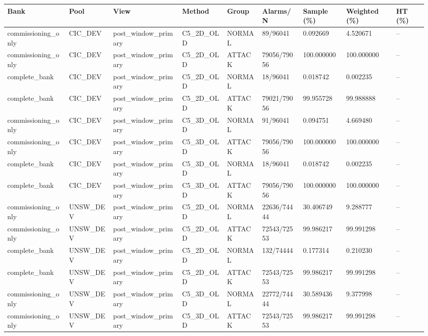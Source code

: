 \begin{tabular}{lllllllll}
\hline
Bank & Pool & View & Method & Group & Alarms/N & Sample (\%) & Weighted (\%) & HT (\%) \\
\hline
commissioning\_only & CIC\_DEV & post\_window\_primary & C5\_2D\_OLD & NORMAL & 89/96041 & 0.092669 & 4.520671 & -- \\
commissioning\_only & CIC\_DEV & post\_window\_primary & C5\_2D\_OLD & ATTACK & 79056/79056 & 100.000000 & 100.000000 & -- \\
complete\_bank & CIC\_DEV & post\_window\_primary & C5\_2D\_OLD & NORMAL & 18/96041 & 0.018742 & 0.002235 & -- \\
complete\_bank & CIC\_DEV & post\_window\_primary & C5\_2D\_OLD & ATTACK & 79021/79056 & 99.955728 & 99.988888 & -- \\
commissioning\_only & CIC\_DEV & post\_window\_primary & C5\_3D\_OLD & NORMAL & 91/96041 & 0.094751 & 4.669480 & -- \\
commissioning\_only & CIC\_DEV & post\_window\_primary & C5\_3D\_OLD & ATTACK & 79056/79056 & 100.000000 & 100.000000 & -- \\
complete\_bank & CIC\_DEV & post\_window\_primary & C5\_3D\_OLD & NORMAL & 18/96041 & 0.018742 & 0.002235 & -- \\
complete\_bank & CIC\_DEV & post\_window\_primary & C5\_3D\_OLD & ATTACK & 79056/79056 & 100.000000 & 100.000000 & -- \\
commissioning\_only & UNSW\_DEV & post\_window\_primary & C5\_2D\_OLD & NORMAL & 22636/74444 & 30.406749 & 9.288777 & -- \\
commissioning\_only & UNSW\_DEV & post\_window\_primary & C5\_2D\_OLD & ATTACK & 72543/72553 & 99.986217 & 99.991298 & -- \\
complete\_bank & UNSW\_DEV & post\_window\_primary & C5\_2D\_OLD & NORMAL & 132/74444 & 0.177314 & 0.210230 & -- \\
complete\_bank & UNSW\_DEV & post\_window\_primary & C5\_2D\_OLD & ATTACK & 72543/72553 & 99.986217 & 99.991298 & -- \\
commissioning\_only & UNSW\_DEV & post\_window\_primary & C5\_3D\_OLD & NORMAL & 22772/74444 & 30.589436 & 9.377998 & -- \\
commissioning\_only & UNSW\_DEV & post\_window\_primary & C5\_3D\_OLD & ATTACK & 72543/72553 & 99.986217 & 99.991298 & -- \\

\end{tabular}
